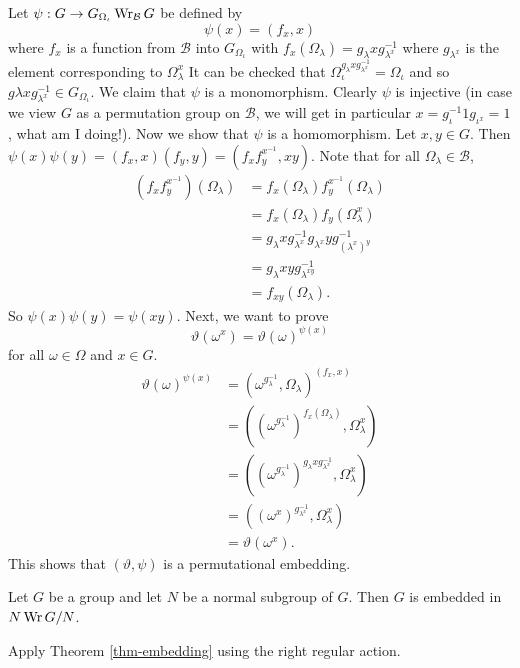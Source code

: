 \begin{sketch}
	Let $\psi:G \to G_{\Omega_\iota} \operatorname{Wr}_{\mathcal{B}} G$ be defined by
	\begin{equation*}
		\psi(x) = (f_x,x)
	\end{equation*}
	where $f_x$ is a function from $\mathcal{B}$ into $G_{\Omega_\iota}$ with $f_x(\Omega_\lambda) = g_{\lambda}xg_{\lambda^x}^{-1}$ where $g_{\lambda^x}$ is the element corresponding to $\Omega_\lambda^x$ It can be checked that $\Omega_\iota^{g_\lambda xg_{\lambda^x}^{-1}} = \Omega_\iota$ and so $g\lambda xg_{\lambda^x}^{-1}\in G_{\Omega_\iota}$. We claim that $\psi$ is a monomorphism. Clearly $\psi$ is injective (in case we view $G$ as a permutation group on $\mathcal{B}$, we will get in particular $x =g_\iota^{-1} 1 g_{\iota^x} =1$, what am I doing!). Now we show that $\psi$ is a homomorphism. Let $x,y\in G$. Then $
		\psi(x)\psi(y) = (f_x,x)(f_y,y) = (f_xf_y^{x^{-1}},xy)$. Note that for all $\Omega_\lambda \in \mathcal{B}$, 
\begin{align*}
	(f_xf_y^{x^{-1}})(\Omega_\lambda) &= f_x(\Omega_\lambda)f_y^{x^{-1}}(\Omega_\lambda) 
	\\
	&= f_x(\Omega_\lambda)f_y(\Omega_\lambda^x) 
	\\
	&= g_{\lambda}xg_{\lambda^x}^{-1}g_{\lambda^x}yg_{(\lambda^{x})^y}^{-1} 
	\\
	&= g_\lambda xy g_{\lambda^{xy}}^{-1} 
	\\
	&= f_{xy}(\Omega_\lambda).
\end{align*}
So $\psi(x)\psi(y) = \psi(xy)$. Next, we want to prove
\begin{equation*}
	\vartheta(\omega^x) = \vartheta(\omega)^{\psi(x)}
\end{equation*}
for all $\omega\in\Omega$ and $x\in G$.
\begin{align*}
	\vartheta(\omega)^{\psi(x)} &= (\omega^{g_\lambda^{-1}},\Omega_\lambda)^{(f_x,x)} 
	\\
	&= ((\omega^{g_\lambda^{-1}})^{f_x(\Omega_\lambda)},\Omega_\lambda^x) 
	\\
	&= ((\omega^{g_\lambda^{-1}})^{g_\lambda x g_{\lambda^x}^{-1}},\Omega_\lambda^x) 
	\\
	&= ((\omega^x)^{g_{\lambda^x}^{-1}},\Omega_\lambda^x) 
	\\
	&= \vartheta(\omega^x).
\end{align*}
This shows that $(\vartheta,\psi)$ is a permutational embedding.
\end{sketch}

\begin{corollary}
	Let $G$ be a group and let $N$ be a normal subgroup of $G$. Then $G$ is embedded in $N \operatorname{Wr} G/N$.
\end{corollary}
\begin{sketch}
	Apply Theorem \ref{thm-embedding} using the right regular action. 
\end{sketch}


